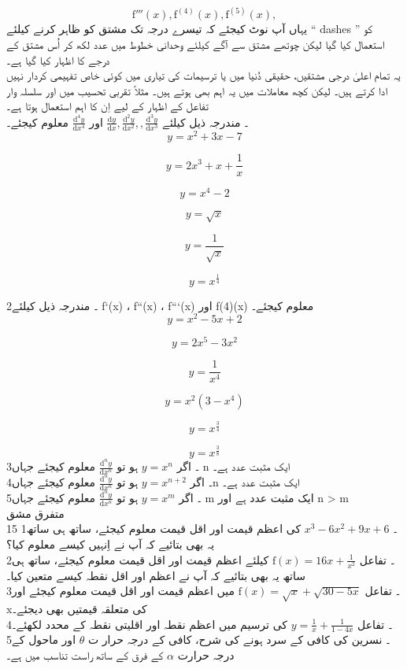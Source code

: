 \[ \text{f}'''(x),\text{f}^{(4)}(x),\text{f}^{(5)}(x),\]	   
	یہاں آپ نوٹ کیجئے کہ تیسرے درجہ تک مشتق کو ظاہر کرنے کیلئے “ dashes  ” کو استعمال کیا گیا لیکن چوتھے مشتق سے آگے کیلئے وحدانی خطوط میں عدد لکھ کر اُس مشتق کے درجے کا اظہار کیا گیا ہے۔ \\
	یہ تمام اعلیٰ درجی مشتقیں، حقیقی دُنیا میں یا ترسیمات کی تیاری میں کوئی خاص  تفہیمی کردار نہیں ادا کرتے ہیں۔ لیکن کچھ معاملات میں یہ اہم بھی ہوتے ہیں۔ مثلاً تقربی تحسیب  میں اور سلسلہ وار تفاعل کے اظہار کے لیے اِن کا اہم استعمال ہوتا ہے۔ \\
۔ مندرجہ ذیل کیلئے 
\(\frac{\text{d}y}{\text{d}x}, \frac{\text{d}^2y}{\text{d}x^2}, , \frac{\text{d}^3y}{\text{d}x^3}\)
  اور 
\(\frac{\text{d}^4y}{\text{d}x^4}\)
   معلوم کیجئے۔ \\
\[y = x^2 + 3x - 7\]

\[y = 2x^3 + x + \frac{1}{x}\]

\[y = x^4 - 2\]

\[y = \sqrt{x}\]

\[y = \frac{1}{\sqrt{x}}\]

\[y = x^{\frac{1}{4}}\]

2۔ مندرجہ ذیل کیلئے  f`(x) ،  f``(x) ،  f```(x) اور f(4)(x)  معلوم کیجئے۔ \\
\[y = x^2 - 5x + 2\]

\[y = 2x^5 - 3x^2\]

\[y = \frac{1}{x^4}\]

\[y = x^2(3 - x^4)\]

\[y = x^{\frac{3}{4}}\]

\[y = x^{\frac{3}{8}}\]
3۔ اگر
\(y = x^n\)
 ہو تو
\(\frac{\text{d}^ny}{\text{d}x^n}\) 
  معلوم کیجئے جہاں n  ایک مثبت عدد ہے۔ \\
4۔ اگر
\(y = x^{n+2}\)
 ہو تو 
\(\frac{\text{d}^ny}{\text{d}x^n}\) 
 معلوم کیجئے جہاںn   ایک مثبت عدد ہے۔\\
5۔ اگر
\(y = x^m\)
ہو تو
\(\frac{\text{d}^ny}{\text{d}x^n}\) 
 معلوم کیجئے جہاں  m  ایک مثبت عدد ہے  اور n > m  \\
متفرق مشق \\15
1۔
\(x^3 - 6x^2 + 9x + 6\)
کی اعظم قیمت اور اقل قیمت معلوم کیجئے، ساتھ ہی ساتھ یہ بھی بتائیے کہ آپ نے اِنہیں کیسے معلوم کیا؟\\
2۔ تفاعل 
\(\text{f}(x) = 16x + \frac{1}{x^2}\)
کیلئے اعظم قیمت اور اقل قیمت معلوم کیجئے، ساتھ ہی ساتھ یہ بھی بتائیے کہ آپ نے اعظم اور اقل نقطہ کیسے متعین کیا۔ \\
3۔ تفاعل
\(\text{f}(x) = \sqrt{x} + \sqrt{30-5x}\)
میں اعظم قیمت اور اقل قیمت معلوم کیجئے اور xکی متعلقہ قیمتیں بھی دیجئے۔ \\
4۔ تفاعل
\(y = \frac{1}{x} + \frac{1}{1-4x}\)
کی ترسیم میں اعظم نقطہ اور اقلیتی نقطہ کے محدد لکھئے۔ \\
5۔ نسرین کی کافی کے سرد ہونے کی شرح،  کافی کے درجہ حرار
ت
\( \theta\)
 اور ماحول کے درجہ حرارت
  \( \alpha\)
 کے فرق کے ساتھ راست تناسب میں ہے۔\\
 
